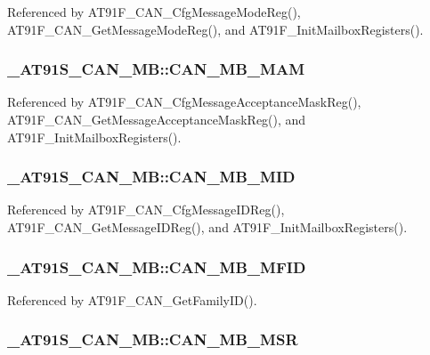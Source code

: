 Referenced by AT91F\_\-CAN\_\-CfgMessageModeReg(), AT91F\_\-CAN\_\-GetMessageModeReg(), and AT91F\_\-InitMailboxRegisters().\hypertarget{struct__AT91S__CAN__MB_88174644fd6cf4e176034b1fe7d8d16c}{
\subsubsection{ {\bf \_\-AT91S\_\-CAN\_\-MB::CAN\_\-MB\_\-MAM}}}
\label{struct__AT91S__CAN__MB_88174644fd6cf4e176034b1fe7d8d16c}




Referenced by AT91F\_\-CAN\_\-CfgMessageAcceptanceMaskReg(), AT91F\_\-CAN\_\-GetMessageAcceptanceMaskReg(), and AT91F\_\-InitMailboxRegisters().\hypertarget{struct__AT91S__CAN__MB_21efa474a69196f0df94ff6714e9feb3}{
\subsubsection{ {\bf \_\-AT91S\_\-CAN\_\-MB::CAN\_\-MB\_\-MID}}}
\label{struct__AT91S__CAN__MB_21efa474a69196f0df94ff6714e9feb3}




Referenced by AT91F\_\-CAN\_\-CfgMessageIDReg(), AT91F\_\-CAN\_\-GetMessageIDReg(), and AT91F\_\-InitMailboxRegisters().\hypertarget{struct__AT91S__CAN__MB_2634668d962e7669f44f042e420ff4d7}{
\subsubsection{ {\bf \_\-AT91S\_\-CAN\_\-MB::CAN\_\-MB\_\-MFID}}}
\label{struct__AT91S__CAN__MB_2634668d962e7669f44f042e420ff4d7}




Referenced by AT91F\_\-CAN\_\-GetFamilyID().\hypertarget{struct__AT91S__CAN__MB_c0b6e12f73a44773934bb212117ca2b7}{
\subsubsection{ {\bf \_\-AT91S\_\-CAN\_\-MB::CAN\_\-MB\_\-MSR}}}
\label{struct__AT91S__CAN__MB_c0b6e12f73a44773934bb212117ca2b7}




